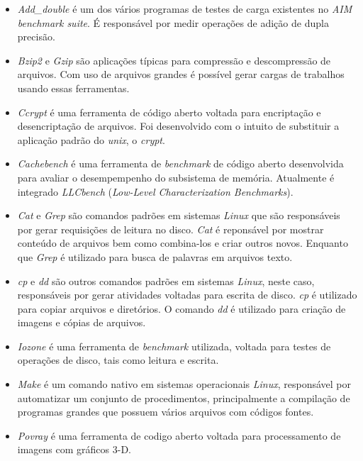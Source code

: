 \documentclass[[10pt,journal]{IEEEtran}
\begin{document}
\begin{itemize}
\item \textit{Add\_double} \footnotemark[2]                                                                                                                               é um dos vários programas de testes de carga existentes no \textit{AIM benchmark suite}. É responsável por medir operações de adição de dupla precisão.

\item \textit{Bzip2} \footnotemark[3] e \textit{Gzip} \footnotemark[4] são aplicações típicas para compressão e descompressão de arquivos. Com uso de arquivos grandes é possível gerar cargas de trabalhos usando essas ferramentas.

\item \textit{Ccrypt} \footnotemark[5] é uma ferramenta de código aberto voltada para encriptação e desencriptação de arquivos. Foi desenvolvido com o intuito de substituir a aplicação padrão do \textit{unix}, o \textit{crypt}.

\item \textit{Cachebench} \footnotemark[6] é uma ferramenta de \textit{benchmark} de código aberto desenvolvida para avaliar o desempempenho do subsistema de memória. Atualmente é integrado \textit{LLCbench} (\textit{Low-Level Characterization Benchmarks}).

\item \textit{Cat} e \textit{Grep} são comandos padrões em sistemas \textit{Linux} que são responsáveis por gerar requisições de leitura no disco. \textit{Cat} é reponsável por mostrar conteúdo de arquivos bem como combina-los e criar outros novos. Enquanto que \textit{Grep} é utilizado para busca de palavras em arquivos texto.

\item \textit{cp} e \textit{dd} são outros comandos padrões em sistemas \textit{Linux}, neste caso, responsáveis por gerar atividades voltadas para escrita de disco. \textit{cp} é utilizado para copiar arquivos e diretórios. O comando \textit{dd} é utilizado para criação de imagens e cópias de arquivos.

\item \textit{Iozone} \footnotemark[7] é uma ferramenta de \textit{benchmark} utilizada, voltada para testes de operações de disco, tais como leitura e escrita.

\item \textit{Make} é um comando nativo em sistemas operacionais \textit{Linux}, responsável por automatizar um conjunto de procedimentos, principalmente  a compilação de programas grandes que possuem vários arquivos com códigos fontes. 

\item \textit{Povray} \footnotemark[8] é uma ferramenta de codigo aberto voltada para processamento de imagens com gráficos 3-D.

\end{itemize}
\end{document}
